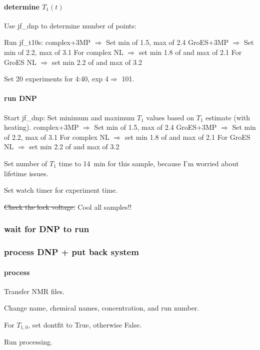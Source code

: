 \paragraph{determine $T_1(t)$}
Use jf\_dnp to determine number of points:

Run jf\_t10s:
complex+3MP $\Rightarrow$ Set min of 1.5, max of 2.4
GroES+3MP $\Rightarrow$ Set min of 2.2, max of 3.1
For complex NL $\Rightarrow$ set min 1.8 of and max of 2.1
For GroES NL $\Rightarrow$ set min 2.2 of and max of 3.2

Set 20 experiments for 4:40, exp 4$\Rightarrow$ 101.

\paragraph{run DNP}
Start jf\_dnp: Set minimum and maximum $T_1$ values based on $T_1$ estimate (with heating).
complex+3MP $\Rightarrow$ Set min of 1.5, max of 2.4
GroES+3MP $\Rightarrow$ Set min of 2.2, max of 3.1
For complex NL $\Rightarrow$ set min 1.8 of and max of 2.1
For GroES NL $\Rightarrow$ set min 2.2 of and max of 3.2

Set number of $T_1$ time to 14~min for this sample, because I'm worried about lifetime issues.

Set watch timer for experiment time.

\sout{ Check the lock voltage. }
Cool all samples!!

\subsubsection{wait for DNP to run}

\subsubsection{process DNP + put back system}
\paragraph{process}
Transfer NMR files.

Change name, chemical names, concentration, and run number.

For $T_{1,0}$, set dontfit to True, otherwise False.

Run processing.

